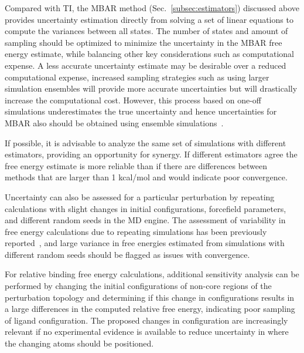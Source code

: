\documentclass[9pt,bestpractices]{livecoms}
\begin{document}
Compared with TI, the MBAR method (Sec.~\ref{subsec:estimators}) discussed above provides uncertainty estimation directly from solving a set of linear equations to compute the variances between all states. 
The number of states and amount of sampling should be optimized to minimize the uncertainty in the MBAR free energy estimate, while balancing other key considerations such as computational expense. 
A less accurate uncertainty estimate may be desirable over a reduced computational expense, increased sampling strategies such as using larger simulation ensembles will provide more accurate uncertainties but will drastically increase the computational cost. 
However, this process based on one-off simulations underestimates the true uncertainty and hence uncertainties for MBAR also should be obtained using ensemble simulations~\cite{bhati2018, wade2022}.

If possible, it is advisable to analyze the same set of simulations with different estimators, providing an opportunity for synergy. If different estimators agree the free energy estimate is more reliable than if there are differences between methods that are larger than 1 kcal/mol and would indicate poor convergence. 

Uncertainty can also be assessed for a particular perturbation by repeating calculations with slight changes in initial configurations, forcefield parameters, and different random seeds in the MD engine. 
The assessment of variability in free energy calculations due to repeating simulations has been previously reported~\cite{aldeghi2019accurate,paliwal2011benchmark,mey2016blinded,mey2018impact, bhati2017, bhati2018, bhati2022, bhati2025}, and large variance in free energies estimated from simulations with different random seeds should be flagged as issues with convergence. 

For relative binding free energy calculations, additional sensitivity analysis can be performed by changing the initial configurations of non-core regions of the perturbation topology and determining if this change in configurations results in a large differences in the computed relative free energy, indicating poor sampling of ligand configuration.
The proposed changes in configuration are increasingly relevant if no experimental evidence is available to reduce uncertainty in where the changing atoms should be positioned.
\end{document}
